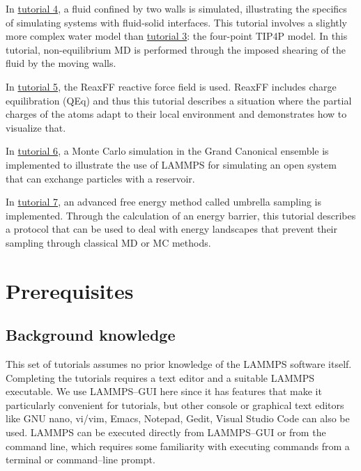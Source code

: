 \documentclass[9pt,tutorial]{livecoms}
\begin{document}
In \hyperref[sheared-confined-label]{tutorial 4}, a fluid confined by
two walls is simulated, illustrating the specifics of simulating systems
with fluid-solid interfaces.  This tutorial involves a slightly more
complex water model than \hyperref[all-atoms-label]{tutorial 3}: the
four-point TIP4P model.  In this tutorial, non-equilibrium MD is
performed through the imposed shearing of the fluid by the moving walls.

In \hyperref[reactive-silicon-dioxide-label]{tutorial 5}, the ReaxFF
reactive force field is used.  ReaxFF includes charge equilibration
(QEq) and thus this tutorial describes a situation where the partial
charges of the atoms adapt to their local environment and demonstrates
how to visualize that.

In \hyperref[gcmc-silica-label]{tutorial 6}, a Monte Carlo simulation in
the Grand Canonical ensemble is implemented to illustrate the use of
LAMMPS for simulating an open system that can exchange particles with a
reservoir.

In \hyperref[umbrella-sampling-label]{tutorial 7}, an advanced free
energy method called umbrella sampling is implemented.  Through the
calculation of an energy barrier, this tutorial describes a protocol
that can be used to deal with energy landscapes that prevent their
sampling through classical MD or MC methods.


\section{Prerequisites}

\subsection{Background knowledge}

This set of tutorials assumes no prior knowledge of the LAMMPS software
itself.  Completing the tutorials requires a text editor and
a suitable LAMMPS executable.  We use LAMMPS--GUI \cite{lammps_gui_docs}
here since it has features that make it particularly convenient for
tutorials, but other console or graphical text editors like GNU nano,
vi/vim, Emacs, Notepad, Gedit, Visual Studio Code can also be
used.  LAMMPS can be executed directly from LAMMPS--GUI
or from the command line, which requires some familiarity with executing
commands from a terminal or command--line prompt.
\end{document}
